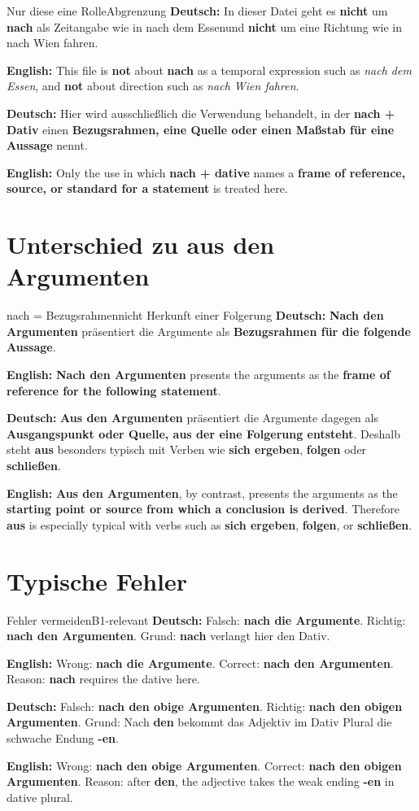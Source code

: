 \documentclass[a4paper,11pt]{article}
\newcommand{\GermanText}[1]{\textbf{Deutsch: }#1\par}
\newcommand{\EnglishText}[1]{{\small\color{SoftGray}\textbf{English: }#1\par}}
\begin{document}
\begin{grammarentry}{Nur diese eine Rolle}{Abgrenzung}
\GermanText{In dieser Datei geht es \textbf{nicht} um \textbf{nach} als Zeitangabe wie in \glqq nach dem Essen\grqq und \textbf{nicht} um eine Richtung wie in \glqq nach Wien fahren\grqq.}
\EnglishText{This file is \textbf{not} about \textbf{nach} as a temporal expression such as \textit{nach dem Essen}, and \textbf{not} about direction such as \textit{nach Wien fahren}.}

\GermanText{Hier wird ausschließlich die Verwendung behandelt, in der \textbf{nach + Dativ} einen \textbf{Bezugsrahmen, eine Quelle oder einen Maßstab für eine Aussage} nennt.}
\EnglishText{Only the use in which \textbf{nach + dative} names a \textbf{frame of reference, source, or standard for a statement} is treated here.}
\end{grammarentry}

\section{Unterschied zu \glqq aus den Argumenten\grqq}

\begin{grammarentry}{nach = Bezugsrahmen}{nicht Herkunft einer Folgerung}
\GermanText{\textbf{Nach den Argumenten} präsentiert die Argumente als \textbf{Bezugsrahmen für die folgende Aussage}.}
\EnglishText{\textbf{Nach den Argumenten} presents the arguments as the \textbf{frame of reference for the following statement}.}

\GermanText{\textbf{Aus den Argumenten} präsentiert die Argumente dagegen als \textbf{Ausgangspunkt oder Quelle, aus der eine Folgerung entsteht}. Deshalb steht \textbf{aus} besonders typisch mit Verben wie \textbf{sich ergeben}, \textbf{folgen} oder \textbf{schließen}.}
\EnglishText{\textbf{Aus den Argumenten}, by contrast, presents the arguments as the \textbf{starting point or source from which a conclusion is derived}. Therefore \textbf{aus} is especially typical with verbs such as \textbf{sich ergeben}, \textbf{folgen}, or \textbf{schließen}.}
\end{grammarentry}

\section{Typische Fehler}

\begin{grammarentry}{Fehler vermeiden}{B1-relevant}
\GermanText{Falsch: \textbf{nach die Argumente}. Richtig: \textbf{nach den Argumenten}. Grund: \textbf{nach} verlangt hier den Dativ.}
\EnglishText{Wrong: \textbf{nach die Argumente}. Correct: \textbf{nach den Argumenten}. Reason: \textbf{nach} requires the dative here.}

\GermanText{Falsch: \textbf{nach den obige Argumenten}. Richtig: \textbf{nach den obigen Argumenten}. Grund: Nach \textbf{den} bekommt das Adjektiv im Dativ Plural die schwache Endung \textbf{-en}.}
\EnglishText{Wrong: \textbf{nach den obige Argumenten}. Correct: \textbf{nach den obigen Argumenten}. Reason: after \textbf{den}, the adjective takes the weak ending \textbf{-en} in dative plural.}
\end{grammarentry}
\end{document}
